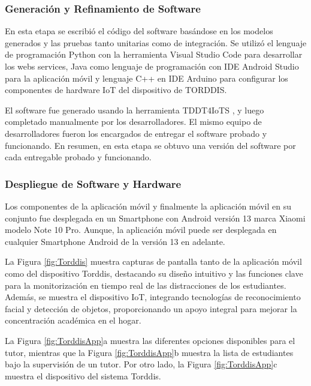 \subsubsection{Generación y Refinamiento de Software}
En esta etapa se escribió el código del software basándose en los modelos generados y las pruebas tanto unitarias como de integración. Se utilizó el lenguaje de programación Python con la herramienta Visual Studio Code \citep{Microsoft2024Visual} para desarrollar los webs services, Java como lenguaje de programación con IDE Android Studio \citep{Android2024Android} para la aplicación móvil y lenguaje C++ en IDE Arduino \citep{Arduino2024Software} para configurar los componentes de hardware IoT del dispositivo de TORDDIS.

El software fue generado usando la herramienta TDDT4IoTS \citep{Guerrero2024Test}, y luego completado manualmente por los desarrolladores. El mismo equipo de desarrolladores fueron los encargados de entregar el software probado y funcionando. En resumen, en esta etapa se obtuvo una versión del software por cada entregable probado y funcionando.

\subsubsection{Despliegue de Software y Hardware}
Los componentes de la aplicación móvil y finalmente la aplicación móvil en su conjunto fue desplegada en un Smartphone con Android versión 13 marca Xiaomi modelo Note 10 Pro. Aunque, la aplicación móvil puede ser desplegada en cualquier Smartphone Android de la versión 13 en adelante.

La Figura \ref{fig:Torddis} muestra capturas de pantalla tanto de la aplicación móvil como del dispositivo Torddis, destacando su diseño intuitivo y las funciones clave para la monitorización en tiempo real de las distracciones de los estudiantes. Además, se muestra el dispositivo IoT, integrando tecnologías de reconocimiento facial y detección de objetos, proporcionando un apoyo integral para mejorar la concentración académica en el hogar.

La Figura \ref{fig:TorddisApp}a muestra las diferentes opciones disponibles para el tutor, mientras que la Figura \ref{fig:TorddisApp}b muestra la lista de estudiantes bajo la supervisión de un tutor. Por otro lado, la Figura \ref{fig:TorddisApp}c muestra el dispositivo del sistema Torddis.

